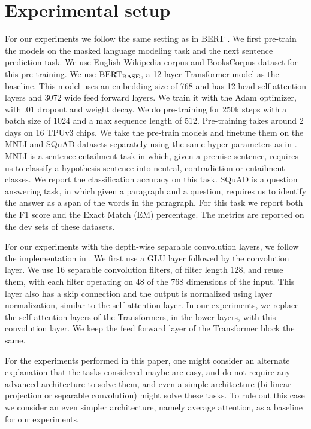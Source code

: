 \section{Experimental setup}\label{sec:appx_experiments}

For our experiments we follow the same setting as in BERT \citep{devlin2018bert}. We first pre-train the models on the masked language modeling task and the next sentence prediction task. We use English Wikipedia corpus and BooksCorpus dataset \citep{zhu2015aligning} for this pre-training. We use $\text{BERT}_{\text{BASE}}$, a 12 layer Transformer model as the baseline. This model uses an embedding size of 768 and has 12 head self-attention layers and 3072 wide feed forward layers. We train it with the Adam optimizer, with $.01$ dropout and weight decay. We do pre-training for 250k steps with a batch size of 1024 and a max sequence length of 512. Pre-training takes around 2 days on 16 TPUv3 chips. We take the pre-train models and finetune them on the MNLI and SQuAD datasets separately using the same hyper-parameters as in \citet{devlin2018bert}. MNLI is a sentence entailment task in which, given a premise sentence, requires us to classify a hypothesis sentence into neutral, contradiction or entailment classes. We report the classification accuracy on this task. SQuAD is a question answering task, in which given a paragraph and a question, requires us to identify the answer as a span of the words in the paragraph. For this task we report both the F1 score and the Exact Match (EM) percentage. The metrics are reported on the dev sets of these datasets.

For our experiments with the depth-wise separable convolution layers, we follow the implementation in \citep{wu2019pay}. We first use a GLU layer followed by the convolution layer. We use 16 separable convolution filters, of filter length 128, and reuse them, with each filter operating on 48 of the 768 dimensions of the input. This layer also has a skip connection and the output is normalized using layer normalization, similar to the self-attention layer. In our experiments, we replace the self-attention layers of the Transformers, in the lower layers, with this convolution layer. We keep the feed forward layer of the Transformer block the same.

For the experiments performed in this paper, one might consider an alternate explanation that the tasks considered maybe are easy, and do not require any advanced architecture to solve them, and even a simple architecture (bi-linear projection or separable convolution) might solve these tasks. To rule out this case we consider an even simpler architecture, namely average attention, as a baseline for our experiments.

